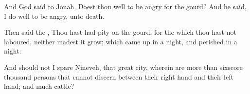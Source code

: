 {And
God
said to
Jonah, Doest thou
well to be
angry for the
gourd? And he
said, I do
well to be
angry,
{} unto
death.

Then
said the
{}, Thou hast had
pity on the
gourd, for the which thou hast not
laboured, neither madest it
grow; which came up in a
night, and
perished in a
night:

And should not I
spare
Nineveh, that
great
city, wherein
are
more than
sixscore
thousand
persons that cannot
discern between their right
hand and their left
hand; and
{}
much
cattle?


\par }